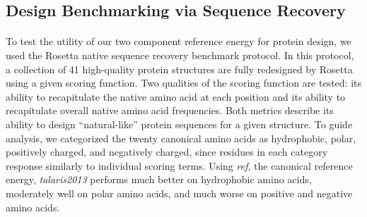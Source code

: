 \subsection{Design Benchmarking via Sequence Recovery}
\paragraph{}
To test the utility of our two component reference energy for protein design, we used the Rosetta native sequence recovery benchmark protocol\cite{leaver-fay_chapter_2013}.
In this protocol, a collection of 41 high-quality protein structures are fully redesigned by Rosetta using a given scoring function.
Two qualities of the scoring function are tested: its ability to recapitulate the native amino acid at each position and its ability to recapitulate overall native amino acid frequencies.
Both metrics describe its ability to design ``natural-like'' protein sequences for a given structure.
To guide analysis, we categorized the twenty canonical amino acids as hydrophobic, polar, positively charged, and negatively charged, since residues in each category response similarly to individual scoring terms.
Using \textit{ref}, the canonical reference energy, \textit{talaris2013} performs much better on hydrophobic amino acids, moderately well on polar amino acids, and much worse on positive and negative amino acids.
